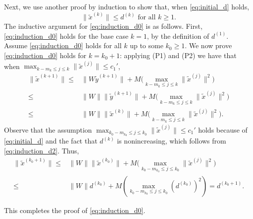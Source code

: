 \documentclass[11pt]{article}
\newcommand{\bx}{\bm{x}}
\newcommand{\bW}{\bm{W}}
\newcommand{\by}{\bm{y}}
\begin{document}
{{{



Next, we use another proof by induction to show that, when  \eqref{eq:initial_d} holds, \begin{equation}\label{eq:induction_d0}\text{$\|\widetilde{x}^{(k)}\| \leq d^{(k)}$ for all $k\geq 1$}.\end{equation} 
The inductive argument for \eqref{eq:induction_d0} is as follows. First, \eqref{eq:induction_d0} holds for the base case $k=1$, {by the definition of $d^{(1)}$}. Assume \eqref{eq:induction_d0} holds for all $k$ up to some $k_0 \geq 1$. 
We now prove \eqref{eq:induction_d0} holds for $k=k_0+1$: applying 
 (P1) and (P2) we have that when $\max_{k-m_k\leq j\leq k}\|{\widetilde{x}}^{(j)}\|\leq c_1'$, 
\begin{align}\label{eq:help_pf_eq}
\| \widetilde{x}^{(k+1)}\| \leq& \|W\widetilde{y}^{(k+1)}\|+  M\big(\max_{k-m_k\leq j\leq k}\|{\widetilde{x}}^{(j)}\|^2\big) \nonumber \\
\leq& \|W\| \|\widetilde{y}^{(k+1)}\|+  M\big(\max_{k-m_k\leq j\leq k}\|{\widetilde{x}}^{(j)}\|^2\big) \nonumber \\
\leq& \|W\| \|\widetilde{x}^{(k)}\|+  M\big(\max_{k-m_k\leq j\leq k}\|{\widetilde{x}}^{(j)}\|^2\big).
\end{align}
Observe that the assumption {$\max_{{k_0}-m_{k_0}\leq j\leq {k_0}}\|{\widetilde{x}}^{(j)}\|\leq c_1'$} holds because of \eqref{eq:initial_d} and the fact that $d^{(k)}$ is nonincreasing, which follows from \eqref{eq:induction_d2}.
Thus, 
\begin{align*}
\|\widetilde{x}^{(k_0+1)}\|\leq &\|W\| \|\widetilde{x}^{(k_0)}\|+  M\big(\max_{k_0-m_{k_0}\leq j\leq k_0}\|{\widetilde{x}}^{(j)}\|^2\big)
\\\leq& \|W\|d^{(k_0)}+M(\max_{k_0-m_{k_0}\leq j\leq k_0}(d^{(k_0)})^2)=d^{(k_0+1)}.
\end{align*}
}
This completes the proof of \eqref{eq:induction_d0}. 

}}
\end{document}
